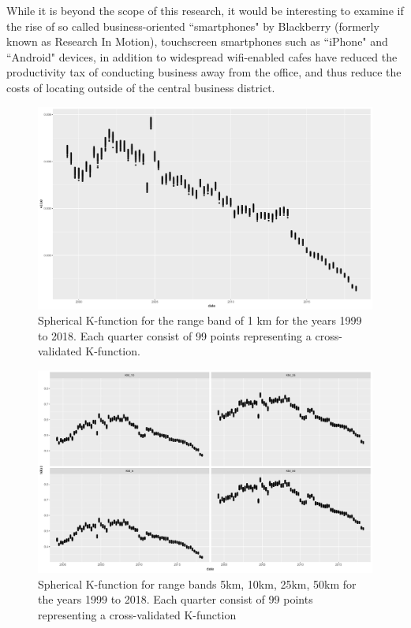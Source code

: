 While it is beyond the scope of this research, it would be interesting to examine if the rise of so called business-oriented ``smartphones" by Blackberry (formerly known as Research In Motion), touchscreen smartphones such as ``iPhone" and ``Android" devices, in addition to widespread wifi-enabled cafes have reduced the productivity tax of conducting business away from the office, and thus reduce the costs of locating outside of the central business district.   

\begin{figure}[h]
	\centering
	\includegraphics[width=1\textwidth]{Figures/ChapterIII/Cross_Val_1k.pdf} 
	\caption[Spherical K-function for Range Band 1km]{Spherical K-function for the range band of 1 km for the years 1999 to 2018.  Each quarter consist of 99 points representing a cross-validated K-function.}
	\label{fig:Kfunction1}
\end{figure}

\begin{figure}[h]
	\centering
	\includegraphics[width=1\textwidth]{Figures/ChapterIII/K_Function_5to50.pdf} 
	\caption[Spherical K-function for Range Bands 5km to 50km]{Spherical K-function for range bands 5km, 10km, 25km, 50km for the years 1999 to 2018. Each quarter consist of 99 points representing a cross-validated K-function}
	\label{fig:Kfunction5to100}
\end{figure}

